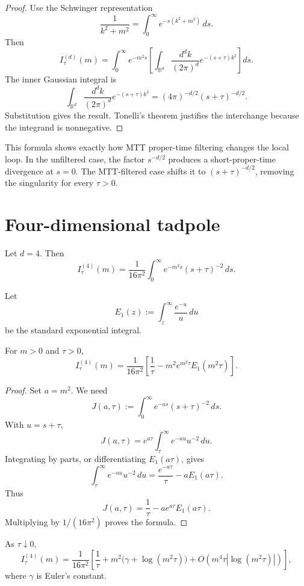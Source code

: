 \documentclass[11pt]{article}
\begin{document}
\begin{proof}
Use the Schwinger representation
\[
\frac{1}{k^2+m^2}=\int_0^\infty e^{-s(k^2+m^2)}\,ds.
\]
Then
\[
I_\tau^{(d)}(m)
=
\int_0^\infty e^{-m^2s}
\left[
\int_{\mathbb R^d}\frac{d^d k}{(2\pi)^d}e^{-(s+\tau)k^2}
\right]ds.
\]
The inner Gaussian integral is
\[
\int_{\mathbb R^d}\frac{d^d k}{(2\pi)^d}e^{-(s+\tau)k^2}
=
(4\pi)^{-d/2}(s+\tau)^{-d/2}.
\]
Substitution gives the result. Tonelli's theorem justifies the interchange because the integrand is nonnegative.
\end{proof}

\begin{remark}
This formula shows exactly how MTT proper-time filtering changes the local loop. In the unfiltered case, the factor \(s^{-d/2}\) produces a short-proper-time divergence at \(s=0\). The MTT-filtered case shifts it to \((s+\tau)^{-d/2}\), removing the singularity for every \(\tau>0\).
\end{remark}

\section{Four-dimensional tadpole}

Let \(d=4\). Then
\[
I_\tau^{(4)}(m)
=
\frac{1}{16\pi^2}
\int_0^\infty e^{-m^2s}(s+\tau)^{-2}\,ds.
\]

Let
\[
E_1(z):=\int_z^\infty \frac{e^{-u}}{u}\,du
\]
be the standard exponential integral.

\begin{theorem}
For \(m>0\) and \(\tau>0\),
\[
I_\tau^{(4)}(m)
=
\frac{1}{16\pi^2}
\left[
\frac{1}{\tau}
-
m^2e^{m^2\tau}E_1(m^2\tau)
\right].
\]
\end{theorem}

\begin{proof}
Set \(a=m^2\). We need
\[
J(a,\tau):=\int_0^\infty e^{-as}(s+\tau)^{-2}\,ds.
\]
With \(u=s+\tau\),
\[
J(a,\tau)=e^{a\tau}\int_\tau^\infty e^{-au}u^{-2}\,du.
\]
Integrating by parts, or differentiating \(E_1(a\tau)\), gives
\[
\int_\tau^\infty e^{-au}u^{-2}\,du
=
\frac{e^{-a\tau}}{\tau}
-
aE_1(a\tau).
\]
Thus
\[
J(a,\tau)=\frac{1}{\tau}-ae^{a\tau}E_1(a\tau).
\]
Multiplying by \(1/(16\pi^2)\) proves the formula.
\end{proof}

\begin{corollary}[Local-limit asymptotics in \(d=4\)]
As \(\tau\downarrow0\),
\[
I_\tau^{(4)}(m)
=
\frac{1}{16\pi^2}
\left[
\frac{1}{\tau}
+
m^2\bigl(\gamma+\log(m^2\tau)\bigr)
+
O\!\left(m^4\tau|\log(m^2\tau)|\right)
\right],
\]
where \(\gamma\) is Euler's constant.
\end{corollary}
\end{document}

